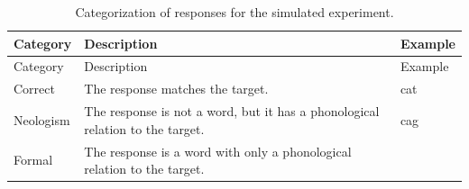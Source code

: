\documentclass[12pt,]{krantz}
\theoremstyle{definition}
\theoremstyle{definition}
\theoremstyle{definition}
\theoremstyle{remark}
\begin{document}
\begin{longtable}[]{@{}lll@{}}
\caption{\label{tab:responses} Categorization of responses for the simulated experiment.}\tabularnewline
\toprule
\begin{minipage}[b]{0.14\columnwidth}\raggedright
Category\strut
\end{minipage} & \begin{minipage}[b]{0.71\columnwidth}\raggedright
Description\strut
\end{minipage} & \begin{minipage}[b]{0.06\columnwidth}\raggedright
Example\strut
\end{minipage}\tabularnewline
\midrule
\endfirsthead
\toprule
\begin{minipage}[b]{0.14\columnwidth}\raggedright
Category\strut
\end{minipage} & \begin{minipage}[b]{0.71\columnwidth}\raggedright
Description\strut
\end{minipage} & \begin{minipage}[b]{0.06\columnwidth}\raggedright
Example\strut
\end{minipage}\tabularnewline
\midrule
\endhead
\begin{minipage}[t]{0.14\columnwidth}\raggedright
Correct\strut
\end{minipage} & \begin{minipage}[t]{0.71\columnwidth}\raggedright
The response matches the target.\strut
\end{minipage} & \begin{minipage}[t]{0.06\columnwidth}\raggedright
cat\strut
\end{minipage}\tabularnewline
\begin{minipage}[t]{0.14\columnwidth}\raggedright
Neologism\strut
\end{minipage} & \begin{minipage}[t]{0.71\columnwidth}\raggedright
The response is not a word, but it has a phonological relation to the target.\strut
\end{minipage} & \begin{minipage}[t]{0.06\columnwidth}\raggedright
cag\strut
\end{minipage}\tabularnewline
\begin{minipage}[t]{0.14\columnwidth}\raggedright
Formal\strut
\end{minipage} & \begin{minipage}[t]{0.71\columnwidth}\raggedright
The response is a word with only a phonological relation to the target.\strut

\end{minipage}
\end{longtable}
\end{document}
